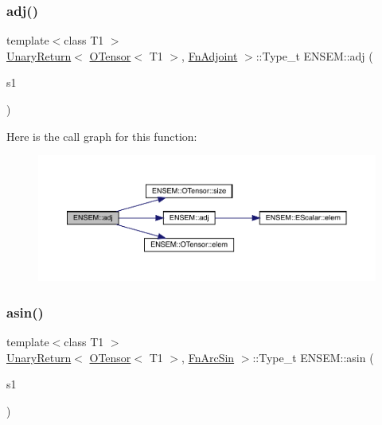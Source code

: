 \subsubsection{\texorpdfstring{adj()}{adj()}}
{\footnotesize\ttfamily template$<$class T1 $>$ \\
\mbox{\hyperlink{structENSEM_1_1UnaryReturn}{Unary\+Return}}$<$ \mbox{\hyperlink{classENSEM_1_1OTensor}{O\+Tensor}}$<$ T1 $>$, \mbox{\hyperlink{structENSEM_1_1FnAdjoint}{Fn\+Adjoint}} $>$\+::Type\+\_\+t E\+N\+S\+E\+M\+::adj (\begin{DoxyParamCaption}\item[{const \mbox{\hyperlink{classENSEM_1_1OTensor}{O\+Tensor}}$<$ T1 $>$ \&}]{s1 }\end{DoxyParamCaption})\hspace{0.3cm}{\ttfamily [inline]}}

Here is the call graph for this function\+:\nopagebreak
\begin{figure}[H]
\begin{center}
\leavevmode
\includegraphics[width=350pt]{de/d87/group__obstensor_ga3c5e5939e51cda2594e94fd03c07ab8b_cgraph}
\end{center}
\end{figure}
\mbox{\label{group__obstensor_gac2f3c33b51a9ad0b1d382eb02ba089df}} 
\subsubsection{\texorpdfstring{asin()}{asin()}}
{\footnotesize\ttfamily template$<$class T1 $>$ \\
\mbox{\hyperlink{structENSEM_1_1UnaryReturn}{Unary\+Return}}$<$ \mbox{\hyperlink{classENSEM_1_1OTensor}{O\+Tensor}}$<$ T1 $>$, \mbox{\hyperlink{structENSEM_1_1FnArcSin}{Fn\+Arc\+Sin}} $>$\+::Type\+\_\+t E\+N\+S\+E\+M\+::asin (\begin{DoxyParamCaption}\item[{const \mbox{\hyperlink{classENSEM_1_1OTensor}{O\+Tensor}}$<$ T1 $>$ \&}]{s1 }\end{DoxyParamCaption})\hspace{0.3cm}{\ttfamily [inline]}}


